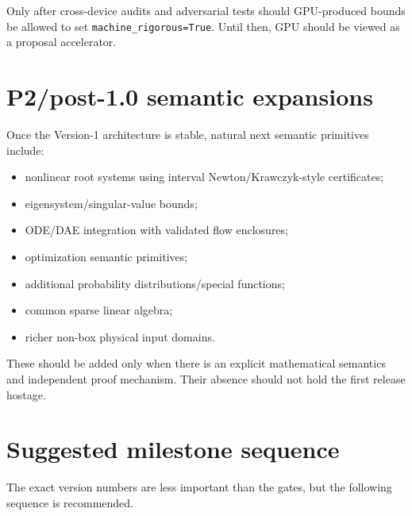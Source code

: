 \documentclass[11pt]{article}
\begin{document}
Only after cross-device audits and adversarial tests should GPU-produced bounds be
allowed to set \texttt{machine\_rigorous=True}.  Until then, GPU should be viewed
as a proposal accelerator.

\section{P2/post-1.0 semantic expansions}

Once the Version-1 architecture is stable, natural next semantic primitives
include:
\begin{itemize}[leftmargin=*]
\item nonlinear root systems using interval Newton/Krawczyk-style certificates;
\item eigensystem/singular-value bounds;
\item ODE/DAE integration with validated flow enclosures;
\item optimization semantic primitives;
\item additional probability distributions/special functions;
\item common sparse linear algebra;
\item richer non-box physical input domains.
\end{itemize}

These should be added only when there is an explicit mathematical semantics and
independent proof mechanism.  Their absence should not hold the first release
hostage.

\section{Suggested milestone sequence}

The exact version numbers are less important than the gates, but the following
sequence is recommended.
\end{document}
